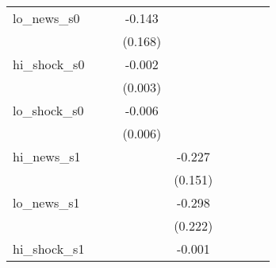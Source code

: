 {\begin{tabular}{l*{8}{c}}
\addlinespace
lo\_news\_s0  &                     &                     &      -0.143         &                     &                     &                     &                     &                     \\
            &                     &                     &     (0.168)         &                     &                     &                     &                     &                     \\
\addlinespace
hi\_shock\_s0 &                     &                     &      -0.002         &                     &                     &                     &                     &                     \\
            &                     &                     &     (0.003)         &                     &                     &                     &                     &                     \\
\addlinespace
lo\_shock\_s0 &                     &                     &      -0.006         &                     &                     &                     &                     &                     \\
            &                     &                     &     (0.006)         &                     &                     &                     &                     &                     \\
\addlinespace
hi\_news\_s1  &                     &                     &                     &      -0.227         &                     &                     &                     &                     \\
            &                     &                     &                     &     (0.151)         &                     &                     &                     &                     \\
\addlinespace
lo\_news\_s1  &                     &                     &                     &      -0.298         &                     &                     &                     &                     \\
            &                     &                     &                     &     (0.222)         &                     &                     &                     &                     \\
\addlinespace
hi\_shock\_s1 &                     &                     &                     &      -0.001         &                     &                     &                     &                     \\

\end{tabular}}
